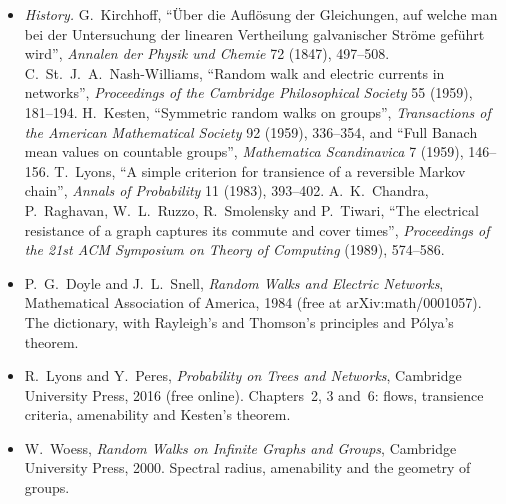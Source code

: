 \begin{itemize}
\item \emph{History.} G.~Kirchhoff, ``\"Uber die Aufl\"osung der Gleichungen, auf welche man bei der Untersuchung der linearen Vertheilung galvanischer Str\"ome gef\"uhrt wird'', \emph{Annalen der Physik und Chemie} 72 (1847),
497--508. C.~St.~J.~A.~Nash-Williams, ``Random walk and electric currents in networks'', \emph{Proceedings of the Cambridge Philosophical Society} 55 (1959), 181--194. H.~Kesten, ``Symmetric random walks on groups'',
\emph{Transactions of the American Mathematical Society} 92 (1959), 336--354, and ``Full Banach mean values on countable groups'', \emph{Mathematica Scandinavica} 7 (1959), 146--156. T.~Lyons, ``A simple criterion for
transience of a reversible Markov chain'', \emph{Annals of Probability} 11 (1983), 393--402. A.~K.~Chandra, P.~Raghavan, W.~L.~Ruzzo, R.~Smolensky and P.~Tiwari, ``The electrical resistance of a graph captures its commute
and cover times'', \emph{Proceedings of the 21st ACM Symposium on Theory of Computing} (1989), 574--586.
\item P.~G.~Doyle and J.~L.~Snell, \emph{Random Walks and Electric Networks}, Mathematical Association of America, 1984 (free at arXiv:math/0001057). The dictionary, with Rayleigh's and Thomson's principles and P\'olya's theorem.
\item R.~Lyons and Y.~Peres, \emph{Probability on Trees and Networks}, Cambridge University Press, 2016 (free online). Chapters~2, 3 and~6: flows, transience criteria, amenability and Kesten's theorem.
\item W.~Woess, \emph{Random Walks on Infinite Graphs and Groups}, Cambridge University Press, 2000. Spectral radius, amenability and the geometry of groups.
\end{itemize}
